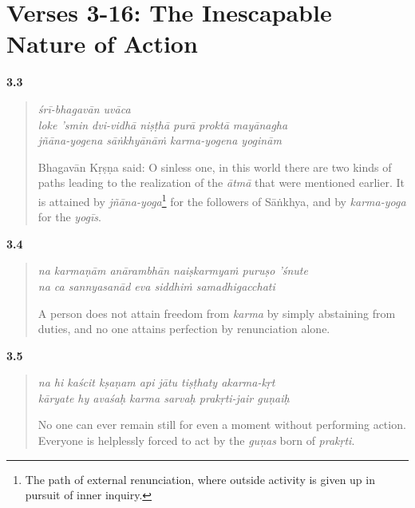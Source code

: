 \section{Verses 3-16: The Inescapable Nature of Action}\label{sec-verses-3-16-the-inescapable-nature-of-action}

\par\noindent\textbf{3.3}\par
\begin{verse}
\textit{śrī-bhagavān uvāca} \\
\textit{loke ’smin dvi-vidhā niṣṭhā purā proktā mayānagha} \\
\textit{jñāna-yogena sāṅkhyānāṁ karma-yogena yoginām}

\noindent Bhagavān Kṛṣṇa said: O sinless one, in this world there are two kinds of paths leading to the realization of the \textit{ātmā} that were mentioned earlier. It is attained by \textit{jñāna-yoga}\footnote{The path of external renunciation, where outside activity is given up in pursuit of inner inquiry.} for the followers of Sāṅkhya, and by \textit{karma-yoga} for the \textit{yogīs}.
\end{verse}
\par



\par\noindent\textbf{3.4}\par
\begin{verse}
\textit{na karmaṇām anārambhān naiṣkarmyaṁ puruṣo ’śnute} \\
\textit{na ca sannyasanād eva siddhiṁ samadhigacchati}

\noindent A person does not attain freedom from \textit{karma} by simply abstaining from duties, and no one attains perfection by renunciation alone.
\end{verse}
\par



\par\noindent\textbf{3.5}\par
\begin{verse}
\textit{na hi kaścit kṣaṇam api jātu tiṣṭhaty akarma-kṛt} \\
\textit{kāryate hy avaśaḥ karma sarvaḥ prakṛti-jair guṇaiḥ}

\noindent No one can ever remain still for even a moment without performing action. Everyone is helplessly forced to act by the \textit{guṇas} born of \textit{prakṛti}.
\end{verse}
\par



